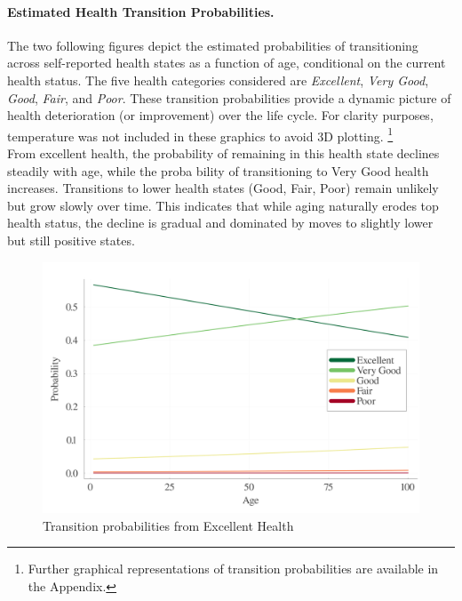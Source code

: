 \documentclass{article}
\begin{document}
\paragraph{Estimated Health Transition Probabilities.}
The two following figures depict the estimated probabilities of transitioning across self-reported health states as a function of age, conditional on the current health status.
The five health categories considered are \textit{Excellent}, \textit{Very Good}, \textit{Good}, \textit{Fair}, and \textit{Poor}.
These transition probabilities provide a dynamic picture of health deterioration (or improvement) over the life cycle.
For clarity purposes, temperature was not included in these graphics to avoid 3D plotting.
\footnote{Further graphical representations of transition probabilities are available in the Appendix.}
\\

From excellent health, the probability of
remaining in this health state declines steadily with age, while the proba
bility of transitioning to Very Good health increases. Transitions to lower
health states (Good, Fair, Poor) remain unlikely but grow slowly over
time. This indicates that while aging naturally erodes top health status,
the decline is gradual and dominated by moves to slightly lower but still
positive states.

\begin{figure}[H]\label{fig:health_transition_1}
    \begin{center}
        \includegraphics[width=\linewidth]{output/health_transition_1.png}
        \caption{Transition probabilities from Excellent Health}    
    \end{center}
\end{figure}
\end{document}
